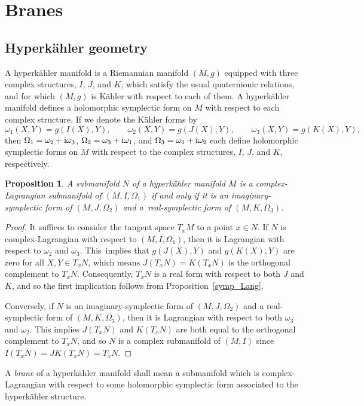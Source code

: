 \documentclass[pdftex]{sigma}
\numberwithin{equation}{section}
\newtheorem{Proposition}[Theorem]{Proposition}
 { \theoremstyle{definition}
\newtheorem{Definition}[Theorem]{Definition}
\newtheorem{Note}[Theorem]{Note}
\newtheorem{Example}[Theorem]{Example}
\newtheorem{Remark}[Theorem]{Remark} }
\begin{document}
\section{Branes}
\subsection{Hyperk\"{a}hler geometry}
A hyperk\"{a}hler manifold is a Riemannian manifold $(M,g)$ equipped with three complex structures, $I$, $J$, and $K$, which satisfy the usual quaternionic relations, and for which $(M,g)$ is K\"{a}hler with respect to each of them. A hyperk\"{a}hler manifold defines a holomorphic symplectic form on $M$ with respect to each complex structure. If we denote the K\"{a}hler forms by
\[
\omega_1(X,Y)=g(I(X),Y),\qquad\omega_2(X,Y)=g(J(X),Y),\qquad\omega_3(X,Y)=g(K(X),Y),
\]
then $\Omega_1=\omega_2+{\rm i}\omega_3$, $\Omega_2=\omega_3+{\rm i}\omega_1$, and $\Omega_3=\omega_1+{\rm i}\omega_2$ each define holomorphic symplectic forms on $M$ with respect to the complex structures, $I$, $J$, and $K$, respectively.

\begin{Proposition}\label{branes}
	A submanifold $N$ of a hyperk\"{a}hler manifold $M$ is a complex-Lagrangian submanifold of $(M,I,\Omega_1)$ if and only if it is an imaginary-symplectic form of $(M,J,\Omega_2)$ and a~real-symplectic form of $(M,K,\Omega_3)$.
\end{Proposition}
\begin{proof}
	It suffices to consider the tangent space $T_xM$ to a point $x\in N$. If $N$ is complex-Lagrangian with respect to $(M,I,\Omega_1)$, then it is Lagrangian with respect to $\omega_2$ and $\omega_3$. This~implies that $g(J(X),Y)$ and $g(K(X),Y)$ are zero for all $X,Y\in T_xN$, which means $J(T_xN)=K(T_xN)$ is the orthogonal complement to $T_xN$. Consequently, $T_xN$ is a real form with respect to both $J$ and $K$, and so the first implication follows from Proposition~\ref{symp_Lang}.
	
	Conversely, if $N$ is an imaginary-symplectic form of $(M,J,\Omega_2)$ and a real-symplectic form of $(M,K,\Omega_3)$, then it is Lagrangian with respect to both $\omega_3$ and $\omega_2$. This implies $J(T_xN)$ and $K(T_xN)$ are both equal to the orthogonal complement to $T_xN$, and so $N$ is a complex submanifold of $(M,I)$ since $I(T_xN)=JK(T_xN)=T_xN$.
\end{proof}

\begin{Definition}
	A \emph{brane} of a hyperk\"{a}hler manifold shall mean a submanifold which is complex-Lagrangian with respect to some holomorphic symplectic form associated to the hyperk\"{a}hler structure.
\end{Definition}
\end{document}
